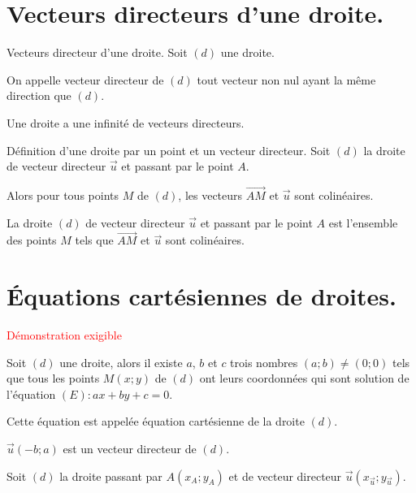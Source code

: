\begin{pageCours} %


\section{Vecteurs directeurs d'une droite.}

\begin{DefT}{Vecteurs directeur d'une droite.}
Soit $(d)$ une droite.

On appelle vecteur directeur de $(d)$ tout vecteur non nul ayant la même direction que $(d)$.
\end{DefT}

\begin{Rq}
Une droite a une infinité de vecteurs directeurs.
\end{Rq}

\begin{PpT}{Définition d'une droite par un point et un vecteur directeur.}
Soit $(d)$ la droite de vecteur directeur $\vec{u}$ et passant par le point $A$.

Alors pour tous points $M$ de $(d)$, les vecteurs $\vec{AM}$ et $\vec{u}$ sont colinéaires.
\end{PpT}

\begin{Def}
La droite $(d)$ de vecteur directeur $\vec{u}$ et passant par le point $A$ est l'ensemble des points $M$ tels que $\vec{AM}$ et $\vec{u}$ sont colinéaires.
\end{Def}

\section{Équations cartésiennes de droites.}

\begin{Pp}
\textcolor{red}{Démonstration exigible}

Soit $(d)$ une droite, alors il existe $a$, $b$ et $c$ trois nombres $(a;b)\neq(0;0)$ tels que tous les points $M(x;y)$ de $(d)$ ont leurs coordonnées qui sont solution de l'équation $(E):ax+by+c=0$.

Cette équation est appelée équation cartésienne de la droite $(d)$.

$\vec{u}(-b;a)$ est un vecteur directeur de $(d)$.
\end{Pp}

\begin{Pv}
Soit $(d)$ la droite passant par $A(x_A;y_A)$ et de vecteur directeur $\vec{u}(x_{\vec{u}};y_{\vec{u}})$.


\end{Pv}
\end{pageCours}
